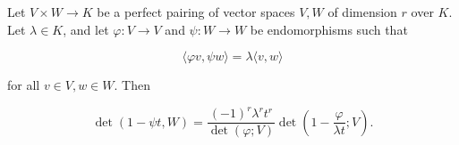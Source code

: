 Let $V \times W \rightarrow K$ be a perfect pairing of vector spaces $V, W$ of dimension $r$ over $K$. Let $\lambda \in K$, and let $\varphi: V \rightarrow V$ and $\psi: W \rightarrow W$ be endomorphisms such that

$$\langle \varphi v, \psi w \rangle = \lambda \langle v, w \rangle$$

for all $v \in V, w \in W$. Then

$$\det(1 - \psi t, W) = \frac{(-1)^r \lambda^r t^r}{\det(\varphi; V)} \det\left(1 - \frac{\varphi}{\lambda t}; V\right).$$
